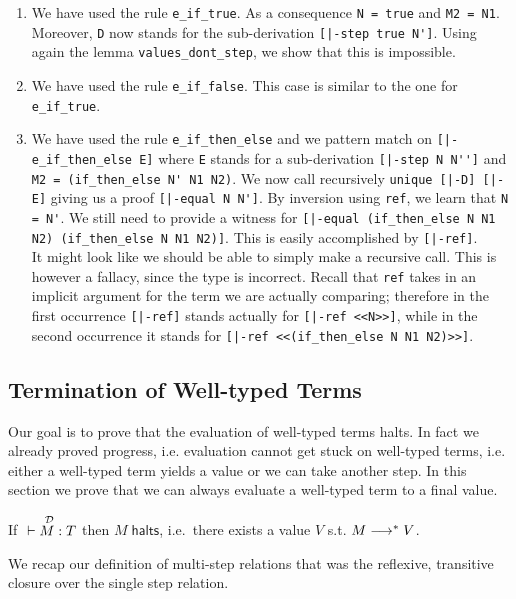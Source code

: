 \begin{enumerate}
\item We have used the rule \lstinline!e_if_true!. As a consequence
  \lstinline!N = true! and \lstinline!M2 = N1!. Moreover,
  \lstinline!D! now stands for the sub-derivation \lstinline![|-step true N']!.
  Using again the lemma \lstinline!values_dont_step!, we show that this is impossible.
\item We have used the rule \lstinline!e_if_false!. This case is similar to
  the one for \lstinline!e_if_true!.
\item We have used the rule \lstinline!e_if_then_else! and we pattern match on
\lstinline![|-e_if_then_else E]! where \lstinline!E! stands for a sub-derivation
\lstinline![|-step N N'']! and \lstinline!M2 = (if_then_else N' N1 N2)!.
We now call recursively \lstinline!unique [|-D] [|-E]! giving us a proof
\lstinline![|-equal N N']!. By inversion using \lstinline!ref!, we learn that
\lstinline!N = N'!. We still need to provide a witness for
\lstinline![|-equal (if_then_else N N1 N2) (if_then_else N N1 N2)]!. This is easily
accomplished by \lstinline![|-ref]!. \\[0.5em]
It might look like we should be able to simply make a recursive call. This is
however a fallacy, since the type is incorrect. Recall that \lstinline!ref!
takes in an implicit argument for the term we are actually comparing; therefore
in the first occurrence \lstinline![|-ref]! stands actually for
\lstinline![|-ref <<N>>]!, while in the second occurrence it %
stands for \lstinline![|-ref <<(if_then_else N N1 N2)>>]!.
\end{enumerate}


\subsection{Termination of Well-typed Terms}
Our goal is to prove that the evaluation of well-typed terms halts. In
fact we already proved progress, i.e. evaluation cannot get stuck on
well-typed terms, i.e. either a well-typed term yields a value or we
can take another step. In this section we prove that we can always
evaluate a well-typed term to a final value.

\begin{theorem}
If $\overset{{\mathcal{D}}}{~\vdash M : T}$ then $M\;\mathsf{halts}$, i.e.~there exists a value $V$ s.t. $M
\longrightarrow^* V$.
\end{theorem}

We recap our definition of multi-step relations that was the
reflexive, transitive closure over the single step relation.

